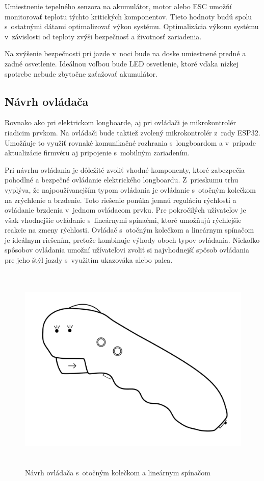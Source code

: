 Umiestnenie tepelného senzora na akumulátor, motor alebo ESC umožňí monitorovať teplotu týchto kritických komponentov.
Tieto hodnoty budú spolu s~ostatnými dátami optimalizovať výkon systému.
Optimalizácia výkonu systému v~závislosti od teploty zvýši bezpečnosť a životnosť zariadenia.

Na zvýšenie bezpečnosti pri jazde v~noci bude na doske umiestnené predné a zadné osvetlenie.
Ideálnou voľbou bude LED osvetlenie, ktoré vďaka nízkej spotrebe nebude zbytočne zaťažovať akumulátor.

\subsection{Návrh ovládača}

Rovnako ako pri elektrickom longboarde, aj pri ovládači je mikrokontrolér riadicim prvkom.
Na ovládači bude taktiež zvolený mikrokontrolér z~rady ESP32.
Umožňuje to využiť rovnaké komunikačné rozhrania s~longboardom a v~prípade aktualizácie firmvéru aj pripojenie s~mobilným zariadením.

Pri návrhu ovládania je dôležité zvoliť vhodné komponenty, ktoré zabezpečia pohodlné a bezpečné ovládanie elektrického longboardu.
Z~prieskumu trhu vyplýva, že najpoužívanejším typom ovládania je ovládanie s~otočným kolečkom na zrýchlenie a brzdenie.
Toto riešenie ponúka jemnú reguláciu rýchlosti a ovládanie brzdenia v~jednom ovládacom prvku.
Pre pokročilých užívateľov je však vhodnejšie ovládanie s~lineárnymi spínačmi, ktoré umožňujú rýchlejšie reakcie na zmeny rýchlosti.
Ovládač s~otočným kolečkom a lineárnym spínačom je ideálnym riešením, pretože kombinuje výhody oboch typov ovládania.
Niekoľko spôsobov ovládania umožní užívateľovi zvoliť si najvhodnejší spôsob ovládania pre jeho štýl jazdy s~využitím ukazováka alebo palca.

\begin{figure}
    \centering
    \includegraphics[height=10cm]{obrazky-figures/controller.pdf}
    \caption{Návrh ovládača s~otočným kolečkom a lineárnym spínačom}\label{fig:remote-control}
\end{figure}

